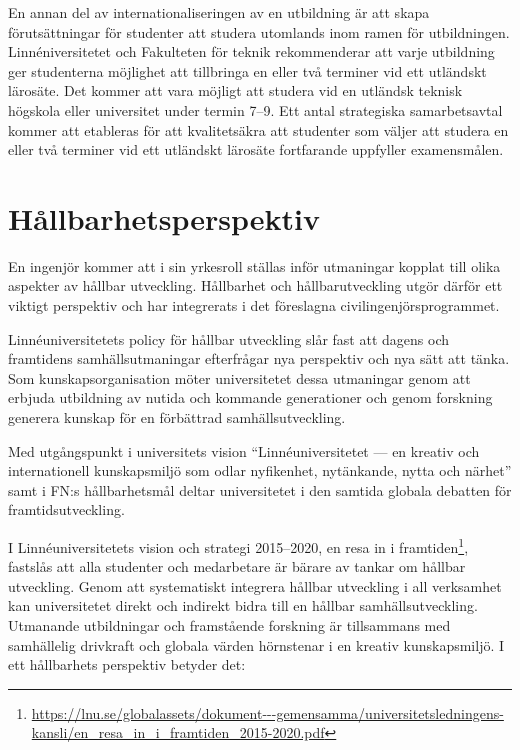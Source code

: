 En annan del av internationaliseringen av en utbildning är att skapa förutsättningar för studenter att studera utomlands inom ramen för utbildningen. Linnéniversitetet och Fakulteten för teknik rekommenderar att varje utbildning ger studenterna möjlighet att tillbringa en eller två terminer vid ett utländskt lärosäte. Det kommer att vara möjligt att studera vid en utländsk teknisk högskola eller universitet under termin 7--9. Ett antal strategiska samarbetsavtal kommer att etableras för att kvalitetsäkra att studenter som väljer att studera en eller två terminer vid ett utländskt lärosäte fortfarande uppfyller examensmålen.

\section{Hållbarhetsperspektiv}

En ingenjör kommer att i sin yrkesroll ställas inför utmaningar kopplat till olika aspekter av hållbar utveckling. Hållbarhet och hållbarutveckling utgör därför ett viktigt perspektiv och har integrerats i det föreslagna civilingenjörsprogrammet.

Linnéuniversitetets policy för hållbar utveckling slår fast att dagens och framtidens samhällsutmaningar efterfrågar nya perspektiv och nya sätt att tänka. Som kunskapsorganisation möter universitetet dessa utmaningar genom att erbjuda utbildning av nutida och kommande generationer och genom forskning generera kunskap för en förbättrad samhällsutveckling.

Med utgångspunkt i universitets vision ``Linnéuniversitetet --- en kreativ och internationell kunskapsmiljö som odlar nyfikenhet, nytänkande, nytta och närhet'' samt i FN:s hållbarhetsmål deltar universitetet i den samtida globala debatten för framtidsutveckling.

I Linnéuniversitetets vision och strategi 2015–2020, en resa in i framtiden\footnote{\url{https://lnu.se/globalassets/dokument---gemensamma/universitetsledningens-kansli/en_resa_in_i_framtiden_2015-2020.pdf}}, fastslås att alla studenter och medarbetare är bärare av tankar om hållbar utveckling. Genom att systematiskt integrera hållbar utveckling i all verksamhet kan universitetet direkt och indirekt bidra till en hållbar samhällsutveckling. Utmanande utbildningar och framstående forskning är tillsammans med samhällelig drivkraft och globala värden hörnstenar i en kreativ kunskapsmiljö. I ett hållbarhets perspektiv betyder det:

